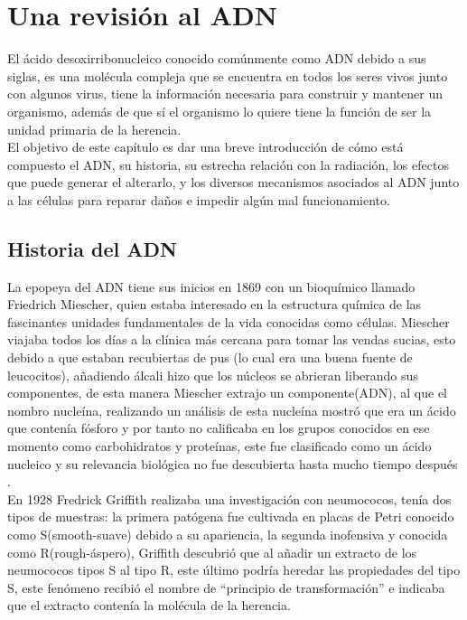 
\clearpage

\section{Una revisión al ADN}
El ácido desoxirribonucleico conocido comúnmente como ADN debido a sus siglas, es una molécula compleja que se encuentra en todos los seres vivos junto con algunos virus, tiene la información necesaria para construir y mantener un organismo, además de que sí el organismo lo quiere tiene la función de ser la unidad primaria de la herencia.\\

El objetivo de este capítulo es dar una breve introducción de cómo está compuesto el ADN, su historia, su estrecha relación con la radiación, los efectos que puede generar el alterarlo, y los diversos mecanismos asociados al ADN junto a las células para reparar daños e impedir algún mal funcionamiento.\\


\subsection{Historia del ADN}
La epopeya del ADN tiene sus inicios en 1869 con un bioquímico llamado Friedrich Miescher, quien estaba interesado en la estructura química de las fascinantes unidades fundamentales de la vida conocidas como células.
Miescher viajaba todos los días a la clínica más cercana para tomar las vendas sucias, esto debido a que estaban recubiertas de pus (lo cual era una buena fuente de leucocitos), añadiendo álcali hizo que los núcleos se abrieran liberando sus componentes, de esta manera Miescher extrajo un componente(ADN), al que el nombro nucleína, realizando un análisis de esta nucleína mostró que era un ácido que contenía fósforo y por tanto no calificaba en los grupos conocidos en ese momento como carbohidratos y proteínas, este fue clasificado como un ácido nucleico y su relevancia biológica no fue descubierta hasta mucho tiempo después \cite{Susan}.\\

En 1928 Fredrick Griffith realizaba una investigación con neumococos, tenía dos tipos de muestras: la primera patógena  fue cultivada en placas de Petri conocido como S(smooth-suave) debido a su apariencia, la segunda inofensiva y conocida como R(rough-áspero), Griffith descubrió que al añadir un extracto de los neumococos tipos S al tipo R, este último podría heredar las propiedades del tipo S, este fenómeno recibió el nombre de “principio de transformación” e indicaba que el extracto contenía la molécula de la herencia.\\

